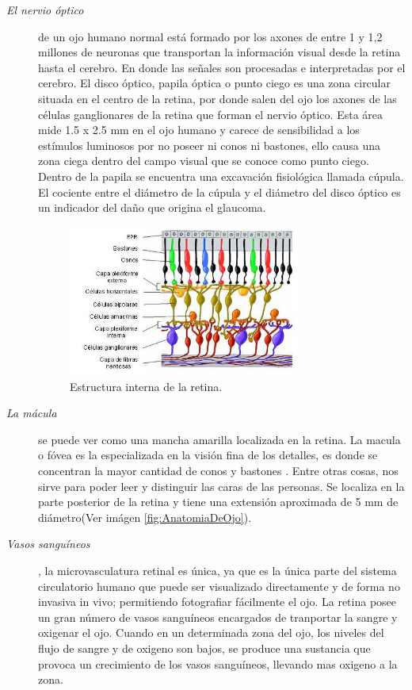 \begin{description}
\item [\normalfont\textit{El nervio \'optico}] de un ojo humano normal est\'a formado por los axones de entre 1 y 1,2 millones de neuronas que transportan la informaci\'on visual desde la retina hasta el cerebro. En donde las señales son procesadas e interpretadas por el cerebro. 
El disco \'optico, papila \'optica o punto ciego es una zona circular situada en el centro de la retina, por donde salen del ojo los axones de las c\'elulas ganglionares de la retina que forman el nervio \'optico. Esta \'area mide 1.5 x 2.5 mm en el ojo humano y carece de sensibilidad a los est\'imulos luminosos por no poseer ni conos ni bastones, ello causa una zona ciega dentro del campo visual que se conoce como punto ciego. Dentro de la papila se encuentra una excavaci\'on fisiol\'ogica llamada c\'upula. El cociente entre el di\'ametro de la c\'upula y el di\'ametro del disco \'optico es un indicador del daño que origina el glaucoma.\cite{li2004automated} \cite{hoover2003locating}
\begin{figure}[H]
	{
	\centering
	\includegraphics[width=0.75\textwidth]{Figures/retinaInterna}
	\caption[Estructura interna de la retina]{Estructura interna de la retina.}
	\label{fig:EstrucInternaRetina}
	}
\end{figure}	
\item [\normalfont\textit{La m\'acula}] se puede ver como una mancha amarilla localizada en la retina. La macula o f\'ovea es la especializada en la visi\'on fina de los detalles, es donde se concentran la mayor cantidad de conos y bastones \cite{li2004automated} \cite{ibanez1999bayesian} \cite{sinthanayothin1999automated}. Entre otras cosas, nos sirve para poder leer y distinguir las caras de las personas. Se localiza en la parte posterior de la retina y tiene una extensi\'on aproximada de 5 mm de di\'ametro(Ver im\'agen \ref{fig:AnatomiaDeOjo}).
\item[\normalfont\textit{Vasos sangu\'ineos}], la microvasculatura retinal es \'unica, ya que es la \'unica parte del sistema circulatorio humano que puede ser visualizado directamente y de forma no invasiva in vivo; permitiendo fotografiar f\'acilmente el ojo. La retina posee un gran n\'umero de vasos sangu\'ineos encargados de tranportar la sangre y oxigenar el ojo. Cuando en un determinada zona del ojo, los niveles del flujo de sangre y de oxigeno son bajos, se produce una sustancia que provoca un crecimiento de los vasos sangu\'ineos, llevando mas oxigeno a la zona. \cite{heneghan2002characterization} \cite{lowell2004measurement}
\end{description}

